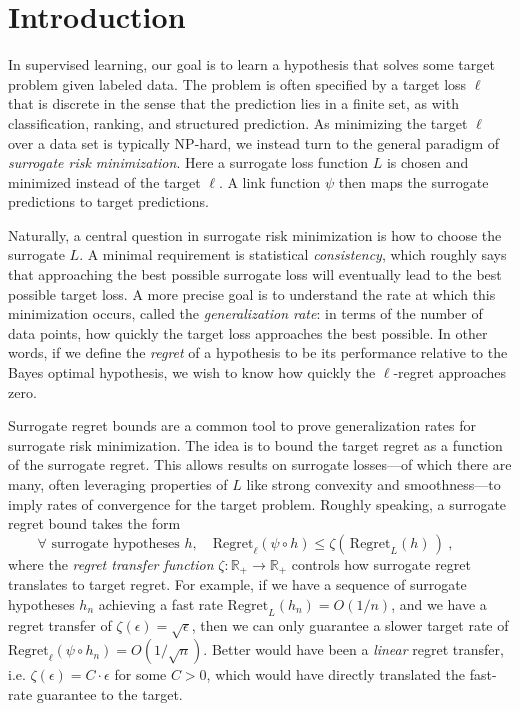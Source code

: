 \documentclass{article}
\theoremstyle{definition}\newtheorem{definition}{Definition}
\theoremstyle{definition}\newtheorem{assumption}{Assumption}
\newcommand{\reals}{\mathbb{R}}
\newcommand{\Reg}{\mathrm{Regret}}
\begin{document}
\section{Introduction}
In supervised learning, our goal is to learn a hypothesis that solves some target problem given labeled data.
The problem is often specified by a target loss $\ell$ that is discrete in the sense that the prediction lies in a finite set, as with classification, ranking, and structured prediction.
As minimizing the target $\ell$ over a data set is typically NP-hard, we instead turn to the general paradigm of \emph{surrogate risk minimization}.
Here a surrogate loss function $L$ is chosen and minimized instead of the target $\ell$.
A link function $\psi$ then maps the surrogate predictions to target predictions.

Naturally, a central question in surrogate risk minimization is how to choose the surrogate $L$.
A minimal requirement is statistical \emph{consistency}, which roughly says that approaching the best possible surrogate loss will eventually lead to the best possible target loss.
A more precise goal is to understand the rate at which this minimization occurs, called the \emph{generalization rate}: in terms of the number of data points, how quickly the target loss approaches the best possible.
In other words, if we define the \emph{regret} of a hypothesis to be its performance relative to the Bayes optimal hypothesis, we wish to know how quickly the $\ell$-regret approaches zero.

Surrogate regret bounds are a common tool to prove generalization rates for surrogate risk minimization.
The idea is to bound the target regret as a function of the surrogate regret.
This allows results on surrogate losses---of which there are many, often leveraging properties of $L$ like strong convexity and smoothness---to imply rates of convergence for the target problem.
Roughly speaking, a surrogate regret bound takes the form
\begin{equation}
  \label{eq:surrogate-regret-bound-informal}
  \forall \text{ surrogate hypotheses } h, \quad \Reg_\ell(\psi\circ h) \leq \zeta(\, \Reg_L(h) \,)~,\qquad
\end{equation}
where the \emph{regret transfer function} $\zeta : \reals_+ \to \reals_+$ controls how surrogate regret translates to target regret.
For example, if we have a sequence of surrogate hypotheses $h_n$ achieving a fast rate $\Reg_L(h_n) = O(1/n)$, and we have a regret transfer of $\zeta(\epsilon) = \sqrt{\epsilon}$, then we can only guarantee a slower target rate of $\Reg_\ell(\psi \circ h_n) = O(1/\sqrt{n})$.
Better would have been a \emph{linear} regret transfer, i.e. $\zeta(\epsilon) = C \cdot \epsilon$ for some $C > 0$, which would have directly translated the fast-rate guarantee to the target.
\end{document}
